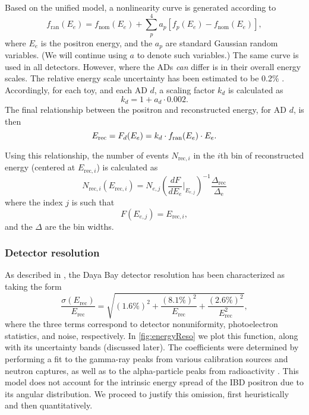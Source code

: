 \documentclass[../thesis.tex]{subfiles}
\begin{document}
Based on the unified model, a nonlinearity curve is generated according to
\begin{equation}
  \label{eq:fitRandomNL}
  f_{\mathrm{ran}}(E_e) = f_{\mathrm{nom}}(E_e) + \sum_p^4 a_p [ f_p(E_e) - f_{\mathrm{nom}}(E_e)],
\end{equation}
where $E_e$ is the positron energy, and the $a_p$ are standard Gaussian random variables. (We will continue using $a$ to denote such variables.) The same curve is used in all detectors. However, where the ADs \textit{can} differ is in their overall energy scales. The relative energy scale uncertainty has been estimated to be 0.2\% \cite{berkeley_shapefit_P14A}. Accordingly, for each toy, and each AD $d$, a scaling factor $k_d$ is calculated as
\begin{equation}
  k_d = 1 + a_d \cdot 0.002.
\end{equation}
The final relationship between the positron and reconstructed energy, for AD $d$, is then
\begin{equation}
  E_\mathrm{rec} = F_d(E_e) = k_d \cdot f_{\mathrm{ran}}(E_e) \cdot E_e.
\end{equation}

Using this relationship, the number of events $N_{\mathrm{rec},i}$ in the $i$th bin of reconstructed energy (centered at $E_{\mathrm{rec},i}$) is calculated as
\begin{equation}
  \label{eq:fitNrec}
  N_{\mathrm{rec},i}(E_{\mathrm{rec},i}) = N_{e,j} \left( \frac{dF}{dE_e} \Bigr|_{E_{e,j}} \right)^{-1} \frac{\Delta_{\mathrm{rec}}}{\Delta_{\mathrm{e}}}
\end{equation}
where the index $j$ is such that
\begin{equation}
  F(E_{e,j}) = E_{\mathrm{rec},i},
\end{equation}
and the $\Delta$ are the bin widths.

\subsubsection{Detector resolution}
\label{sec:fitResolution}

As described in \cite{An_2017}, the Daya Bay detector resolution has been characterized as taking the form
\begin{equation}
  \label{eq:resolution}
  \frac{\sigma(E_{\mathrm{rec}})}{E_{\mathrm{rec}}} = \sqrt{(1.6\%)^2 + \frac{(8.1\%)^2}{E_{\mathrm{rec}}}
    + \frac{(2.6\%)^2}{E_{\mathrm{rec}}^2}},
\end{equation}
where the three terms correspond to detector nonuniformity, photoelectron statistics, and noise, respectively. In \autoref{fig:energyReso} we plot this function, along with its uncertainty bands (discussed later). The coefficients were determined by performing a fit to the gamma-ray peaks from various calibration sources and neutron captures, as well as to the alpha-particle peaks from radioactivity \cite{An_2017}. This model does not account for the intrinsic energy spread of the IBD positron due to its angular distribution. We proceed to justify this omission, first heuristically and then quantitatively.
\end{document}
